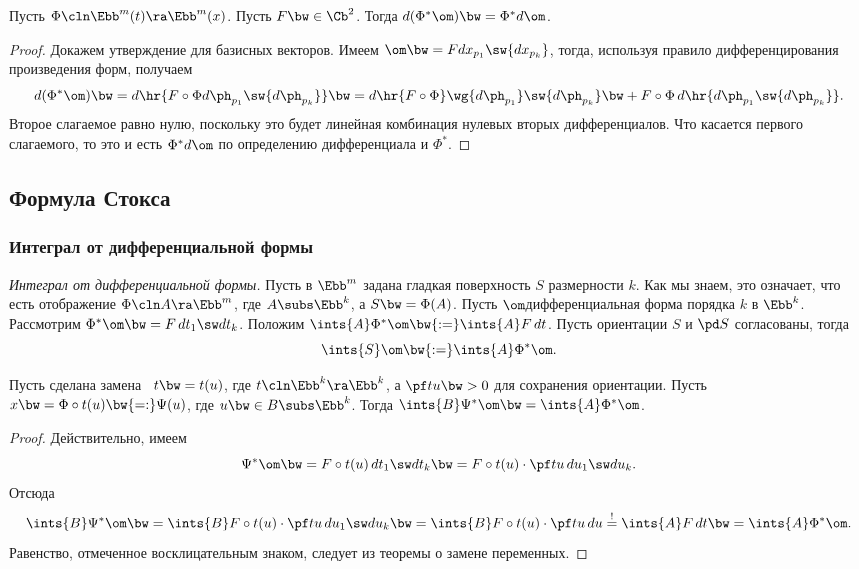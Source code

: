 \documentclass[a4paper]{article}
\newcommand{\di}[3]{{d {#1}_{#2_{#3}}}}
\begin{document}
\begin{theorem}
Пусть $\Phi\cln \Ebb^m(t) \ra \Ebb^m(x)$. Пусть $F \bw\in \Cb^2$. Тогда $d(\Phi^*\om) \bw= \Phi^*d \om$.
\end{theorem}
\begin{proof}
Докажем утверждение для базисных векторов. Имеем $\om \bw= F\di xp1 \sw \di xpk$, тогда, используя правило дифференцирования
произведения форм, получаем
$$
  d(\Phi^*\om) \bw= d\hr{F \circ \Phi \di\ph p1\sw \di\ph pk} \bw=
  d\hr{F\circ \Phi} \wg \di\ph p1\sw \di\ph pk \bw+
  F\circ\Phi\,d\hr{\di\ph p1\sw \di\ph pk}.
$$
Второе слагаемое равно нулю, поскольку это будет линейная комбинация нулевых вторых
дифференциалов. Что касается первого слагаемого, то это и есть $\Phi^*d\om$ по определению дифференциала и
$\Phi^*$.
\end{proof}

\subsection{Формула Стокса}

\subsubsection{Интеграл от дифференциальной формы}

\begin{df}
\emph{Интеграл от дифференциальной формы.} Пусть в $\Ebb^m$ задана гладкая поверхность $S$ размерности $k$.
Как мы знаем, это означает, что есть отображение $\Phi\cln A \ra \Ebb^m$, где $A \subs \Ebb^k$, а $S \bw=
\Phi(A)$. Пусть $\om$\т дифференциальная форма порядка $k$ в $\Ebb^k$. Рассмотрим $\Phi^*\om \bw= F\,d t_1\sw
d t_k$. Положим $\ints{A}\Phi^*\om \bw{:=} \ints{A}F\,d t$. Пусть ориентации $S$ и $\pd S$ согласованы,
тогда
$$\ints{S} \om \bw{:=} \ints{A} \Phi^*\om.$$
\end{df}

\begin{theorem}
Пусть сделана замена \ $t \bw= t(u)$, где $t\cln \Ebb^k \ra \Ebb^k$, а $\pf tu \bw> 0$ для
сохранения ориентации. Пусть $x \bw= \Phi\circ t(u) \bw{=:} \Psi(u)$, где $u \bw\in B \subs \Ebb^k$.
Тогда $\ints{B} \Psi^* \om \bw= \ints{A} \Phi^*\om$.
\end{theorem}
\begin{proof}
Действительно, имеем
$$\Psi^*\om \bw= F\circ t(u) \,d t_1\sw d t_k \bw= F\circ t(u) \cdot \pf tu \,d u_1\sw d u_k.$$
Отсюда
$$\ints{B}\Psi^*\om \bw= \ints{B}F\circ t (u) \cdot \pf tu \,d u_1\sw d u_k \bw=
\ints{B}F\circ t(u) \cdot \pf tu \,d u \stackrel{!}{=} \ints{A}F\,d t\bw= \ints{A} \Phi^*\om.$$ Равенство,
отмеченное восклицательным знаком, следует из теоремы о замене переменных.
\end{proof}
\end{document}
